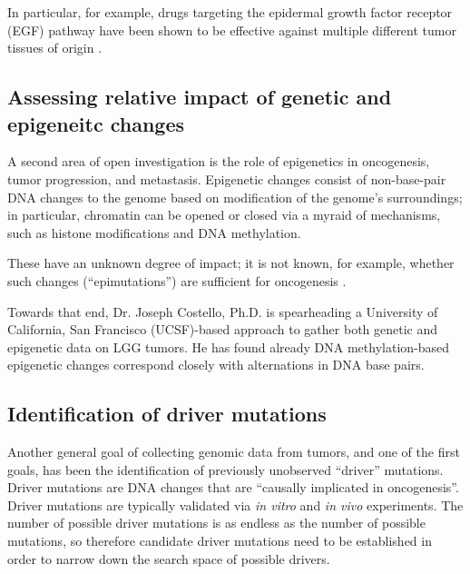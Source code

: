         In particular, for  example, drugs targeting the epidermal growth factor receptor
        (EGF) pathway have been shown to be effective against multiple
        different tumor tissues of origin
        \cite{barretina_cancer_2012}.


        \subsection{Assessing relative impact of genetic and
          epigeneitc changes}

        A second area of open investigation is the role of epigenetics
        in oncogenesis, tumor progression, and
        metastasis. Epigenetic changes consist of non-base-pair
        DNA changes to the genome based on modification of the
        genome's surroundings; in particular, chromatin can be opened
        or closed via a myraid of mechanisms, such as histone
       modifications and DNA methylation\cite{kouzarides_chromatin_2007}.

        These have an unknown degree of impact;
        it is not known, for example, whether such changes
        (``epimutations'') are sufficient for oncogenesis
        \cite{nagarajan_recurrent_2014} \cite{feinberg_epigenetic_2006}. 

        Towards that end, Dr. Joseph Costello, Ph.D. is spearheading a
        University of California, San Francisco (UCSF)-based approach to
        gather both genetic and epigenetic data on LGG tumors. He has
        found already DNA methylation-based epigenetic changes
        correspond closely with alternations in DNA base
        pairs\cite{johnson_mutational_2014}. 

        \subsection{Identification of driver mutations}

        Another general goal of collecting genomic data from tumors,
        and one of the first goals, has been the identification of
        previously unobserved  ``driver'' mutations. Driver mutations are DNA changes that
        are  ``causally implicated
        in oncogenesis''\cite{stratton_cancer_2009}. Driver mutations
        are typically validated via \textit{in vitro} and \textit{in vivo}
        experiments. The number of possible driver mutations is as
        endless as the number of possible mutations, so therefore
        candidate driver mutations need to be established in order to
        narrow down the search space of possible drivers. 

